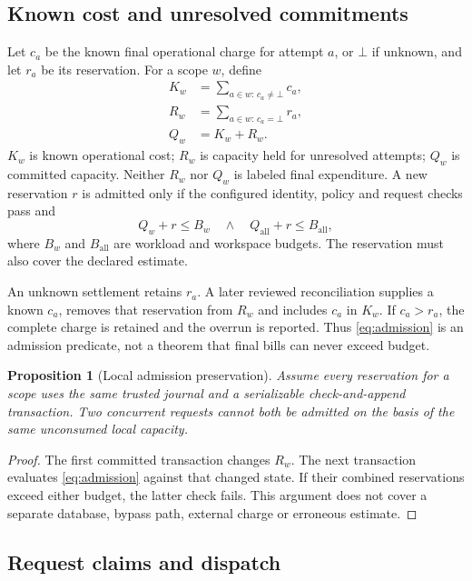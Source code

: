 \documentclass[10pt,twocolumn]{article}
\newtheorem{proposition}{Proposition}
\begin{document}
\subsection{Known cost and unresolved commitments}

Let $c_a$ be the known final operational charge for attempt $a$, or $\bot$ if unknown, and let $r_a$ be its reservation. For a scope $w$, define
\begin{align}
K_w &= \sum_{a\in w:\,c_a\ne\bot}c_a,\label{eq:known}\\
R_w &= \sum_{a\in w:\,c_a=\bot}r_a,\label{eq:reserved}\\
Q_w &= K_w+R_w.\label{eq:committed}
\end{align}
$K_w$ is known operational cost; $R_w$ is capacity held for unresolved attempts; $Q_w$ is committed capacity. Neither $R_w$ nor $Q_w$ is labeled final expenditure. A new reservation $r$ is admitted only if the configured identity, policy and request checks pass and
\begin{equation}
Q_w+r\le B_w\quad\land\quad Q_{\mathrm{all}}+r\le B_{\mathrm{all}},
\label{eq:admission}
\end{equation}
where $B_w$ and $B_{\mathrm{all}}$ are workload and workspace budgets. The reservation must also cover the declared estimate.

An unknown settlement retains $r_a$. A later reviewed reconciliation supplies a known $c_a$, removes that reservation from $R_w$ and includes $c_a$ in $K_w$. If $c_a>r_a$, the complete charge is retained and the overrun is reported. Thus \cref{eq:admission} is an admission predicate, not a theorem that final bills can never exceed budget.

\begin{proposition}[Local admission preservation]
Assume every reservation for a scope uses the same trusted journal and a serializable check-and-append transaction. Two concurrent requests cannot both be admitted on the basis of the same unconsumed local capacity.
\end{proposition}
\begin{proof}
The first committed transaction changes $R_w$. The next transaction evaluates \cref{eq:admission} against that changed state. If their combined reservations exceed either budget, the latter check fails. This argument does not cover a separate database, bypass path, external charge or erroneous estimate.
\end{proof}

\subsection{Request claims and dispatch}
\end{document}
